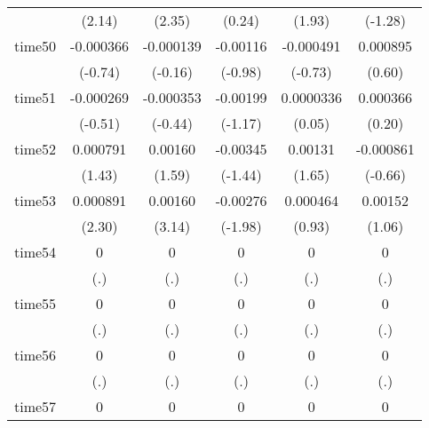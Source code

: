 \begin{table}[htbp]
\begin{tabular}{l*{5}{c}}
            &      (2.14)         &      (2.35)         &      (0.24)         &      (1.93)         &     (-1.28)         \\
time50      &   -0.000366         &   -0.000139         &    -0.00116         &   -0.000491         &    0.000895         \\
            &     (-0.74)         &     (-0.16)         &     (-0.98)         &     (-0.73)         &      (0.60)         \\
time51      &   -0.000269         &   -0.000353         &    -0.00199         &   0.0000336         &    0.000366         \\
            &     (-0.51)         &     (-0.44)         &     (-1.17)         &      (0.05)         &      (0.20)         \\
time52      &    0.000791         &     0.00160         &    -0.00345         &     0.00131         &   -0.000861         \\
            &      (1.43)         &      (1.59)         &     (-1.44)         &      (1.65)         &     (-0.66)         \\
time53      &    0.000891\sym{*}  &     0.00160\sym{**} &    -0.00276\sym{*}  &    0.000464         &     0.00152         \\
            &      (2.30)         &      (3.14)         &     (-1.98)         &      (0.93)         &      (1.06)         \\
time54      &           0         &           0         &           0         &           0         &           0         \\
            &         (.)         &         (.)         &         (.)         &         (.)         &         (.)         \\
time55      &           0         &           0         &           0         &           0         &           0         \\
            &         (.)         &         (.)         &         (.)         &         (.)         &         (.)         \\
time56      &           0         &           0         &           0         &           0         &           0         \\
            &         (.)         &         (.)         &         (.)         &         (.)         &         (.)         \\
time57      &           0         &           0         &           0         &           0         &           0         \\

\end{tabular}
\end{table}
